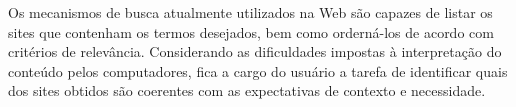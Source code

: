 

Os mecanismos de busca atualmente utilizados na Web são capazes de listar os sites que contenham os termos desejados, bem como orderná-los de acordo com critérios de relevância. Considerando as dificuldades impostas à interpretação do conteúdo pelos computadores, fica a cargo do usuário a tarefa de identificar quais dos sites obtidos são coerentes com as expectativas de contexto e necessidade.










